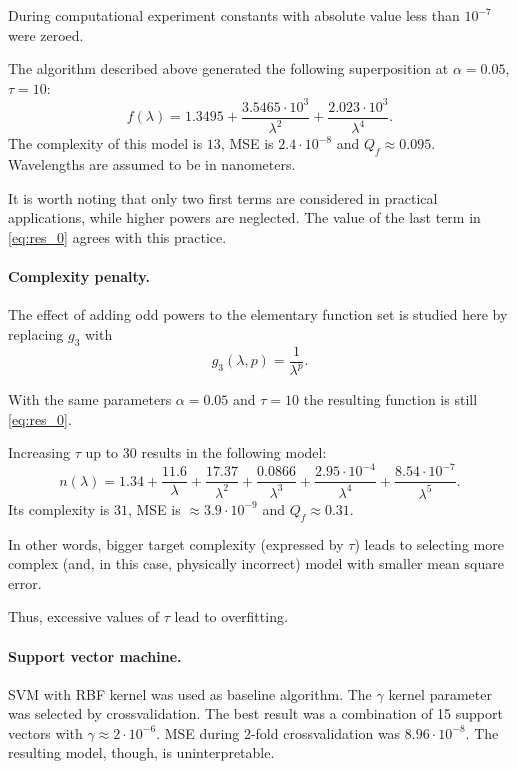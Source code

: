 \documentclass[11pt,a4paper]{article}
\theoremstyle{definition}
\begin{document}
During computational experiment constants with absolute value less than $10^{-7}$
were zeroed.

The algorithm described above generated the following superposition at $\alpha = 0.05$, $\tau = 10$:
\begin{equation}
  f(\lambda) = 1.3495 + \frac{3.5465 \cdot 10^3}{\lambda^2} + \frac{2.023 \cdot 10^3}{\lambda^4}.
  \label{eq:res_0}
\end{equation}
The complexity of this model is $13$, MSE is $2.4 \cdot 10^{-8}$ and $Q_f \approx 0.095$.
Wavelengths are assumed to be in nanometers.

It is worth noting that only two first terms are considered in practical applications, while
higher powers are neglected. The value of the last term in \eqref{eq:res_0}
agrees with this practice.

\paragraph{Complexity penalty.}

The effect of adding odd powers to the elementary function set is studied here by replacing
$g_3$ with 
\[
  g_3(\lambda, p) = \frac{1}{\lambda^p}.
\]

With the same parameters $\alpha = 0.05$ and $\tau = 10$ the resulting function is still
\eqref{eq:res_0}.

Increasing $\tau$ up to 30 results in the following model:
\begin{equation}
  n(\lambda) = 1.34 + \frac{11.6}{\lambda} + \frac{17.37}{\lambda^2} + \frac{0.0866}{\lambda^3} + \frac{2.95 \cdot 10^{-4}}{\lambda^4} + \frac{8.54 \cdot 10^{-7}}{\lambda^5}.
  \label{eq:res_incorrect}
\end{equation}
Its complexity is $31$, MSE is $\approx 3.9 \cdot 10^{-9}$ and $Q_f \approx 0.31$.

In other words, bigger target complexity (expressed by $\tau$) leads to selecting
more complex (and, in this case, physically incorrect) model with smaller mean square error.

Thus, excessive values of $\tau$ lead to overfitting.

\paragraph{Support vector machine.}

SVM with RBF kernel \citep{Vapnik79_en} was used as baseline algorithm. The $\gamma$ kernel
parameter was selected by crossvalidation. The best result was a combination of 15
support vectors with $\gamma \approx 2 \cdot 10^{-6}$. MSE during 2-fold crossvalidation
was $8.96 \cdot 10^{-8}$. The resulting model, though, is uninterpretable.
\end{document}
